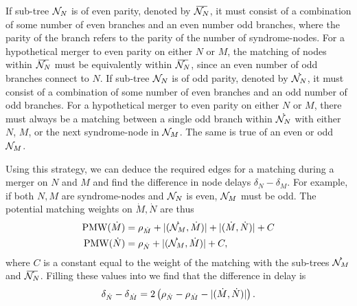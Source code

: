 If sub-tree $\mathcal{N}_N$ is of even parity, denoted by $\overbar{\nset_N}$, it must consist of a combination of some number of even branches and an even number odd branches, where the parity of the branch refers to the parity of the number of syndrome-nodes. For a hypothetical merger to even parity on either $N$ or $M$, the matching of nodes within $\overbar{\nset_N}$ must be equivalently within $\overbar{\nset_N}$, since an even number of odd branches connect to $N$. If sub-tree $\mathcal{N}_N$ is of odd parity, denoted by $\dot{\mathcal{N}_N}$, it must consist of a combination of some number of even branches and an odd number of odd branches. For a hypothetical merger to even parity on either $N$ or $M$, there must always be a matching between a single odd branch within $\dot{\mathcal{N}_N}$ with either $N$, $M$, or the next syndrome-node in $\mathcal{N}_M$. The same is true of an even or odd $\mathcal{N}_M$.

Using this strategy, we can deduce the required edges for a matching during a merger on $N$ and $M$ and find the difference in node delays $\delta_N - \delta_M$. For example, if both $N,M$ are syndrome-nodes and $\mathcal{N}_N$ is even, $\mathcal{N}_M$ must be odd. The potential matching weights on $\dot{M},\dot{N}$ are thus
\begin{align*}
  \text{PMW}(\dot{M}) &= \rho_{\dot{M}} + \lvert(\dot{\mathcal{N}_M},\dot{M})\rvert + \lvert(\dot{M}, \dot{N})\rvert + C \\
  \text{PMW}(\dot{N}) &= \rho_{\dot{N}} + \lvert(\dot{\mathcal{N}_M},\dot{M})\rvert + C,
\end{align*}
where $C$ is a constant equal to the weight of the matching with the sub-trees $\dot{\mathcal{N}_M}$ and $\overbar{\nset_N}$. Filling these values into  we find that the difference in delay is 
\begin{equation*}
  \delta_{\dot{N}} - \delta_{\dot{M}} = 2\left(\rho_{\dot{N}} - \rho_{\dot{M}} - \lvert(\dot{M}, \dot{N})\rvert\right).
\end{equation*}

